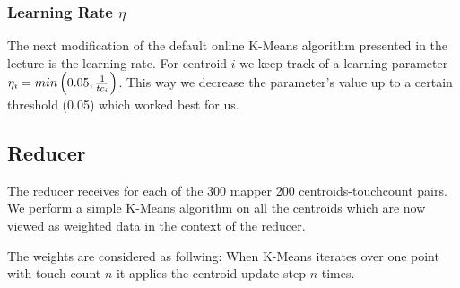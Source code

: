 \documentclass[a4paper, 11pt]{article}
\begin{document}
\subsubsection{Learning Rate $\eta$}
The next modification of the default online K-Means algorithm presented in the lecture is the learning rate. For centroid $i$ we keep track of a learning parameter $\eta_i = min \left(0.05, {1\over tc_i} \right)$. This way we decrease the parameter's value up to a certain threshold (0.05) which worked best for us.

\subsection{Reducer}
The reducer receives for each of the 300 mapper 200 centroids-touchcount pairs. We perform a simple K-Means algorithm on all the centroids which are now viewed as weighted data in the context of the reducer.

The weights are considered as follwing: When K-Means iterates over one point with touch count $n$ it applies the centroid update step $n$ times.




\end{document}
